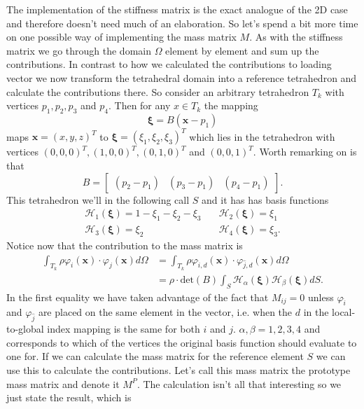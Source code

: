 \documentclass[paper=a4, fontsize=11pt]{scrartcl} %
\begin{document}
The implementation of the stiffness matrix is the exact analogue of the 2D case and therefore doesn't need much of an elaboration. So let's spend a bit more time on one possible way of implementing the mass matrix $M$. As with the stiffness matrix we go through the domain $\Omega$ element by element and sum up the contributions. In contrast to how we calculated the contributions to loading vector we now transform the tetrahedral domain into a reference tetrahedron and calculate the contributions there. So consider an arbitrary tetrahedron $T_k$ with vertices $p_1, p_2, p_3$ and $p_4$. Then for any $x\in T_k$ the mapping
\begin{equation*}
\boldsymbol{\xi} = B(\boldsymbol{x}-p_1)
\end{equation*}
maps $\boldsymbol{x}=(x,y,z)^T$ to $\boldsymbol{\xi}=(\xi_1,\xi_2,\xi_3)^T$ which lies in the tetrahedron with vertices $(0,0,0)^T,(1,0,0)^T,(0,1,0)^T$ and $(0,0,1)^T$. Worth remarking on is that
\begin{equation}
B = \begin{bmatrix}
(p_2 - p_1) & (p_3-p_1) & (p_4-p_1)
\end{bmatrix}.
\end{equation} This tetrahedron we'll in the following call $S$ and it has has basis functions
\begin{align*}
\mathcal{H}_1(\boldsymbol{\xi}) = 1-\xi_1-\xi_2 - \xi_3 &\quad \mathcal{H}_2(\boldsymbol{\xi}) = \xi_1 \\
\mathcal{H}_3(\boldsymbol{\xi}) = \xi_2 &\quad \mathcal{H}_4(\boldsymbol{\xi}) = \xi_3.
\end{align*}
Notice now that the contribution to the mass matrix is
\begin{align*}
\int_{T_k}\rho \varphi_i(\boldsymbol{x})\cdot \varphi_j(\boldsymbol{x})d\Omega &= \int_{T_k}\rho \varphi_{\hat{i},d}(\boldsymbol{x})\cdot \varphi_{\hat{j},d}(\boldsymbol{x})d\Omega \\
&= \rho\cdot \text{det}(B)\int_S\mathcal{H}_{\alpha}(\boldsymbol{\xi})\mathcal{H}_{\beta}(\boldsymbol{\xi})dS.
\end{align*}
In the first equality we have taken advantage of the fact that $M_{ij}=0$ unless $\varphi_{\hat{i}}$ and $\varphi_{\hat{j}}$ are placed on the same element in the vector, i.e. when the $d$ in the local-to-global index mapping is the same for both $i$ and $j$. $\alpha, \beta = 1,2,3,4$ and corresponds to which of the vertices the original basis function should evaluate to one for. If we can calculate the mass matrix for the reference element $S$ we can use this to calculate the contributions. Let's call this mass matrix the prototype mass matrix and denote it $M^P$. The calculation isn't all that interesting so we just state the result, which is
\end{document}
